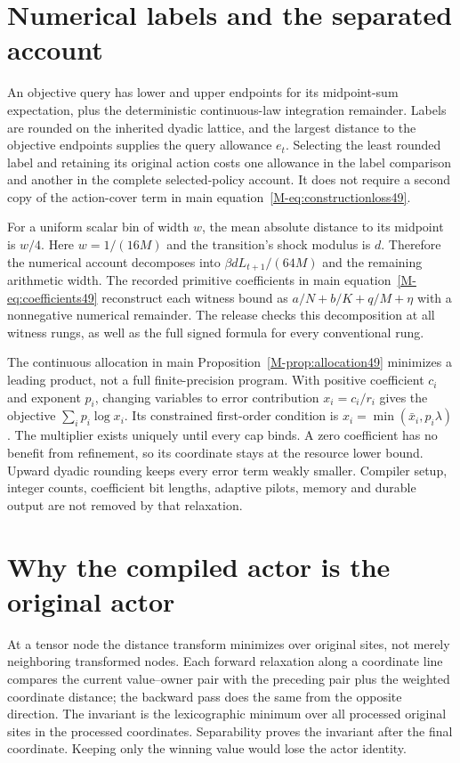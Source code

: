 \documentclass[ecta,nameyear,draft]{econsocart}
\begin{document}
\section{Numerical labels and the separated account}\label{supp:numerical49}
An objective query has lower and upper endpoints for its midpoint-sum expectation, plus the deterministic continuous-law integration remainder. Labels are rounded on the inherited dyadic lattice, and the largest distance to the objective endpoints supplies the query allowance $e_t$. Selecting the least rounded label and retaining its original action costs one allowance in the label comparison and another in the complete selected-policy account. It does not require a second copy of the action-cover term in main equation~\eqref{M-eq:constructionloss49}.

For a uniform scalar bin of width $w$, the mean absolute distance to its midpoint is $w/4$. Here $w=1/(16M)$ and the transition's shock modulus is $d$. Therefore the numerical account decomposes into $\beta dL_{t+1}/(64M)$ and the remaining arithmetic width. The recorded primitive coefficients in main equation~\eqref{M-eq:coefficients49} reconstruct each witness bound as $a/N+b/K+q/M+\eta$ with a nonnegative numerical remainder. The release checks this decomposition at all witness rungs, as well as the full signed formula for every conventional rung.

The continuous allocation in main Proposition~\ref{M-prop:allocation49} minimizes a leading product, not a full finite-precision program. With positive coefficient $c_i$ and exponent $p_i$, changing variables to error contribution $x_i=c_i/r_i$ gives the objective $\sum_i p_i\log x_i$. Its constrained first-order condition is $x_i=\min(\bar x_i,p_i\lambda)$. The multiplier exists uniquely until every cap binds. A zero coefficient has no benefit from refinement, so its coordinate stays at the resource lower bound. Upward dyadic rounding keeps every error term weakly smaller. Compiler setup, integer counts, coefficient bit lengths, adaptive pilots, memory and durable output are not removed by that relaxation.

\section{Why the compiled actor is the original actor}\label{supp:owner49}
At a tensor node the distance transform minimizes over original sites, not merely neighboring transformed nodes. Each forward relaxation along a coordinate line compares the current value--owner pair with the preceding pair plus the weighted coordinate distance; the backward pass does the same from the opposite direction. The invariant is the lexicographic minimum over all processed original sites in the processed coordinates. Separability proves the invariant after the final coordinate. Keeping only the winning value would lose the actor identity.
\end{document}
